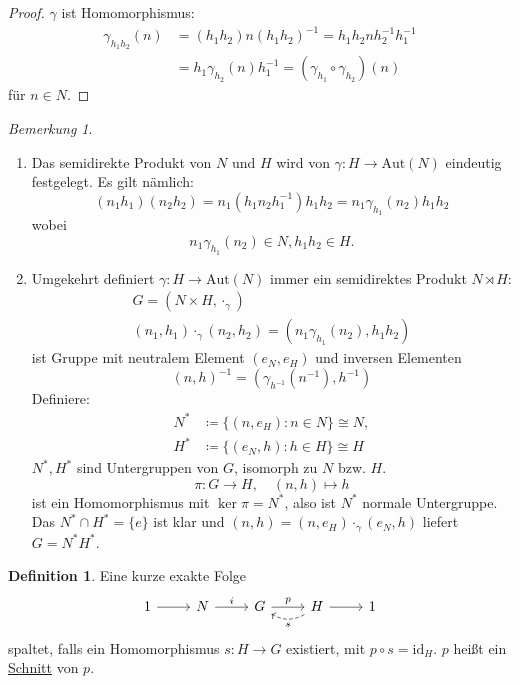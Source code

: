 \documentclass[12pt]{scrartcl}%
\theoremstyle{definition}
\newtheorem*{defn}{Definition}
\theoremstyle{remark}
\newtheorem*{nb}{Bemerkung}
\newcommand{\inv}[1]{\left(#1\right)^{-1}}
\newcommand{\Inv}[1]{#1^{-1}}
\begin{document}
\begin{proof}
    $\gamma$ ist Homomorphismus:
    \begin{align*}
        \gamma_{h_1h_2}(n)&=(h_1h_2)n\inv{h_1h_2}=h_1h_2n\Inv{h_2}\Inv{h_1} \\
        &= h_1\gamma_{h_2}(n)\Inv{h_1}=(\gamma_{h_1}\circ\gamma_{h_2})(n)
    \end{align*}
    für $n\in N$.
\end{proof}

\begin{nb}
    \begin{enumerate}[label=(\arabic*)]
        \item Das semidirekte Produkt von $N$ und $H$ wird von $\gamma: H\to \text{Aut}(N)$ eindeutig festgelegt.
        Es gilt nämlich: $$(n_1h_1)(n_2h_2)=n_1(h_1n_2\Inv{h_1})h_1h_2=n_1\gamma_{h_1}(n_2)h_1h_2$$ wobei $$n_1\gamma_{h_1}(n_2)\in N, h_1h_2\in H.$$
        \item Umgekehrt definiert $\gamma: H\to \text{Aut}(N)$ immer ein semidirektes Produkt $N\rtimes H$: %
            \begin{gather*}
                G=(N\times H, \cdot_\gamma) \\
                (n_1,h_1)\cdot_\gamma (n_2,h_2)=(n_1\gamma_{h_1}(n_2), h_1h_2)
            \end{gather*}
            ist Gruppe mit neutralem Element $(e_N, e_H)$ und inversen Elementen $$\Inv{(n,h)}=(\gamma_{\Inv{h}}(\Inv{n}),\Inv{h})$$
            Definiere:
            \begin{align*}
                N^*&\coloneqq \{(n, e_H): n\in N\} \cong N, \\
                H^*&\coloneqq \{(e_N, h): h\in H\} \cong H
            \end{align*}
            $N^*,H^*$ sind Untergruppen von $G$, isomorph zu $N$ bzw. $H$. $$\pi: G\longrightarrow H, \quad (n,h)\mapsto h$$ ist ein Homomorphismus mit $\ker \pi = N^*$, also ist $N^*$ normale Untergruppe.
            Das $N^*\cap H^* = \{e\}$ ist klar und $(n,h)=(n,e_H)\cdot_\gamma (e_N, h)$ liefert $G=N^*H^*$.
    \end{enumerate}
\end{nb}

\begin{defn}
    Eine kurze exakte Folge
    \[ \begin{tikzcd}
        1 \arrow[r] & N \arrow[r, "i"] & G \arrow[r, "p"] & H \arrow[l, bend left, dashed, "s"] \arrow[r] & 1
    \end{tikzcd} \]
    spaltet, falls ein Homomorphismus $s: H\to G$ existiert, mit $p\circ s = \text{id}_H$. $p$ heißt ein \underline{Schnitt} von $p$. %
\end{defn}
\end{document}
